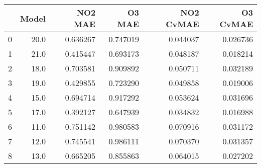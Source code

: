 \begin{tabular}{lrrrrr}
\toprule
{} &  Model &   NO2 MAE &    O3 MAE &  NO2 CvMAE &  O3 CvMAE \\
\midrule
0 &   20.0 &  0.636267 &  0.747019 &   0.044037 &  0.026736 \\
1 &   21.0 &  0.415447 &  0.693173 &   0.048187 &  0.018214 \\
2 &   18.0 &  0.703581 &  0.909892 &   0.050711 &  0.032189 \\
3 &   19.0 &  0.429855 &  0.723290 &   0.049858 &  0.019006 \\
4 &   15.0 &  0.694714 &  0.917292 &   0.053624 &  0.031696 \\
5 &   17.0 &  0.392127 &  0.647939 &   0.034832 &  0.016988 \\
6 &   11.0 &  0.751142 &  0.980583 &   0.070916 &  0.031172 \\
7 &   12.0 &  0.745541 &  0.986111 &   0.070370 &  0.031357 \\
8 &   13.0 &  0.665205 &  0.855863 &   0.064015 &  0.027202 \\
\bottomrule
\end{tabular}
